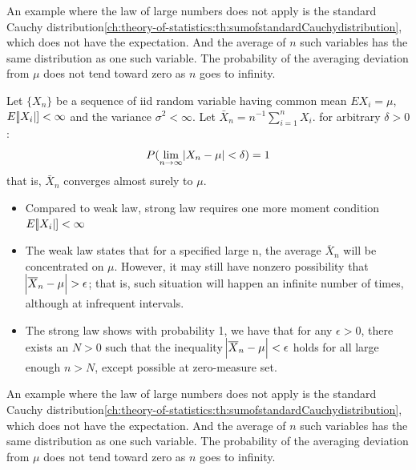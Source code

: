 \begin{refsection}
\begin{remark}
An example where the law of large numbers does not apply is the standard Cauchy distribution\autoref{ch:theory-of-statistics:th:sumofstandardCauchydistribution}, which does not have the expectation. And the average of $n$ such variables has the same distribution as one such variable. The probability of the averaging deviation from $\mu$ does not tend toward zero as $n$ goes to infinity.	
\end{remark}


\begin{theorem}\label{ch:theory-of-probability:th:stronglawlargenumber}
\cite[235]{casella2002statistical}Let $\{X_n\}$ be a sequence of iid random variable having common mean $EX_i = \mu$,$E[\abs{X_i}] < \infty$ and the variance $\sigma^2 < \infty$. Let $\bar{X}_n = n^{-1}\sum_{i=1}^n X_i$. for arbitrary $\delta > 0$:
$$P(\lim_{n\rightarrow \infty }\abs{X_n - \mu}<\delta) = 1$$
that is, $\bar{X}_n$ converges almost surely to $\mu$.
\end{theorem}



\begin{remark}[discussion]\hfill
\begin{itemize}
    \item Compared to weak law, strong law requires one more moment condition 
    $E[\abs{X_i}] < \infty$
    \item The weak law states that for a specified large n, the average $\overline{X}_{n}$ will be concentrated on $\mu$. However, it may still have nonzero possibility that $\abs{\overline{X}_n - \mu} > \epsilon$; that is, such situation will  happen an infinite number of times, although at infrequent intervals.
    \item The strong law shows with probability 1, we have that for any $\epsilon > 0$, there exists an $N > 0$ such that the inequality $\abs{\overline{X}_n - \mu} < \epsilon$ holds for all large enough $n > N$, except possible at zero-measure set.
\end{itemize}
\end{remark}

\begin{remark}
	An example where the law of large numbers does not apply is the standard Cauchy distribution\autoref{ch:theory-of-statistics:th:sumofstandardCauchydistribution}, which does not have the expectation. And the average of $n$ such variables has the same distribution as one such variable. The probability of the averaging deviation from $\mu$ does not tend toward zero as $n$ goes to infinity.	
\end{remark}




\end{refsection}
